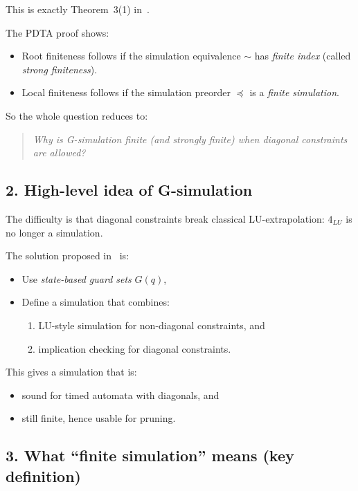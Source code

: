 \documentclass{article}
\begin{document}
This is exactly Theorem~3(1) in~\cite{PDTA}.

The PDTA proof shows:
\begin{itemize}
  \item Root finiteness follows if the simulation equivalence
        $\sim$ has \emph{finite index} (called \emph{strong finiteness}).
  \item Local finiteness follows if the simulation preorder
        $\preceq$ is a \emph{finite simulation}.
\end{itemize}

So the whole question reduces to:
\begin{quote}
\emph{Why is G-simulation finite (and strongly finite) when diagonal
constraints are allowed?}
\end{quote}


\subsection*{2. High-level idea of G-simulation}

The difficulty is that diagonal constraints break classical
LU-extrapolation: $4_{LU}$ is no longer a simulation.

The solution proposed in~\cite{GAbs} is:
\begin{itemize}
  \item Use \emph{state-based guard sets} $G(q)$,
  \item Define a simulation that combines:
    \begin{enumerate}
      \item LU-style simulation for non-diagonal constraints, and
      \item implication checking for diagonal constraints.
    \end{enumerate}
\end{itemize}

This gives a simulation that is:
\begin{itemize}
  \item sound for timed automata with diagonals, and
  \item still finite, hence usable for pruning.
\end{itemize}


\subsection*{3. What ``finite simulation'' means (key definition)}
\end{document}
